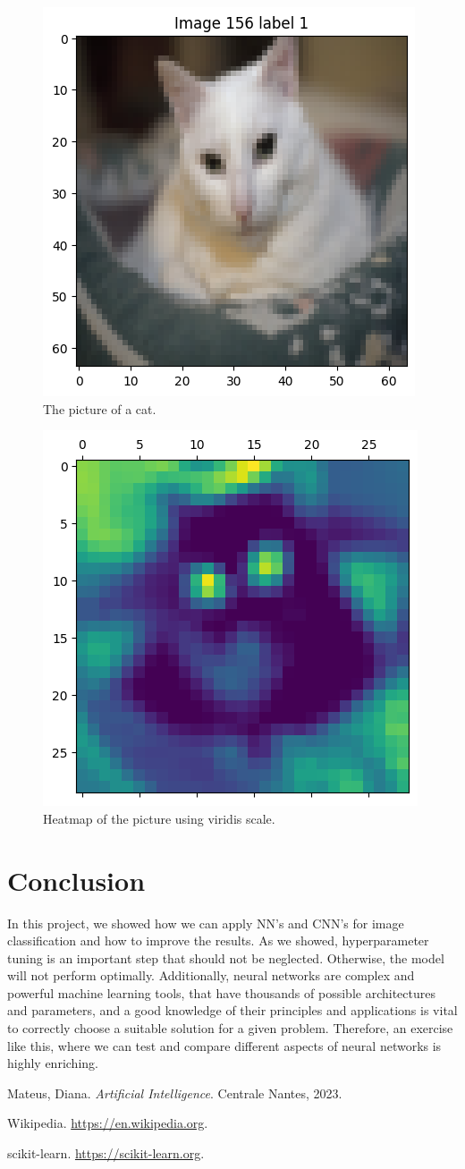 \documentclass{thesisreport}
\begin{document}
\begin{figure}[H]
    \centering
    \includegraphics[width=0.5\linewidth]{figures/cat_156.png}
    \caption{The picture of a cat.}
    \label{fig:cat_156}
\end{figure}

\begin{figure}[H]
    \centering
    \includegraphics[width=0.5\linewidth]{figures/cat_156_heatmap.png}
    \caption{Heatmap of the picture using viridis scale.}
    \label{fig:cat_156}
\end{figure}

\newpage

\chapter*{Conclusion}
In this project, we showed how we can apply NN's and CNN's for image classification and how to improve the results. As we showed, hyperparameter tuning is an important step that should not be neglected. Otherwise, the model will not perform optimally. Additionally, neural networks are complex and powerful machine learning tools, that have thousands of possible architectures and parameters, and a good knowledge of their principles and applications is vital to correctly choose a suitable solution for a given problem. Therefore, an exercise like this, where we can test and compare different aspects of neural networks is highly enriching. 

\begin{thebibliography}{9}
    Mateus, Diana.
    \emph{Artificial Intelligence}.
    Centrale Nantes, 2023.

    Wikipedia.
    \url{https://en.wikipedia.org}.

    scikit-learn.
    \url{https://scikit-learn.org}.
\end{thebibliography}
\end{document}
